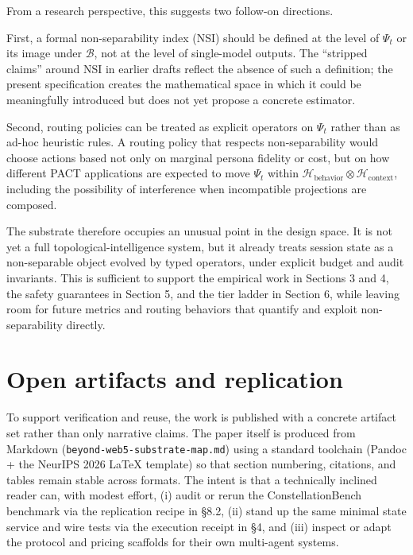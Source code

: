 \documentclass{article}
\begin{document}
From a research perspective, this suggests two follow-on directions.

First, a formal non-separability index (NSI) should be defined at the
level of \(\Psi_t\) or its image under \(\mathcal{B}\), not at the level
of single-model outputs. The ``stripped claims'' around NSI in earlier
drafts reflect the absence of such a definition; the present
specification creates the mathematical space in which it could be
meaningfully introduced but does not yet propose a concrete estimator.

Second, routing policies can be treated as explicit operators on
\(\Psi_t\) rather than as ad-hoc heuristic rules. A routing policy that
respects non-separability would choose actions based not only on
marginal persona fidelity or cost, but on how different PACT
applications are expected to move \(\Psi_t\) within
\(\mathcal{H}_{\text{behavior}} \otimes \mathcal{H}_{\text{context}}\),
including the possibility of interference when incompatible projections
are composed.

The substrate therefore occupies an unusual point in the design space.
It is not yet a full topological-intelligence system, but it already
treats session state as a non-separable object evolved by typed
operators, under explicit budget and audit invariants. This is
sufficient to support the empirical work in Sections 3 and 4, the safety
guarantees in Section 5, and the tier ladder in Section 6, while leaving
room for future metrics and routing behaviors that quantify and exploit
non-separability directly.

\section{Open artifacts and
replication}\label{open-artifacts-and-replication}

To support verification and reuse, the work is published with a concrete
artifact set rather than only narrative claims. The paper itself is
produced from Markdown (\texttt{beyond-web5-substrate-map.md}) using a
standard toolchain (Pandoc + the NeurIPS 2026 LaTeX template) so that
section numbering, citations, and tables remain stable across formats.
The intent is that a technically inclined reader can, with modest
effort, (i) audit or rerun the ConstellationBench benchmark via the
replication recipe in §8.2, (ii) stand up the same minimal state service
and wire tests via the execution receipt in §4, and (iii) inspect or
adapt the protocol and pricing scaffolds for their own multi-agent
systems.
\end{document}
